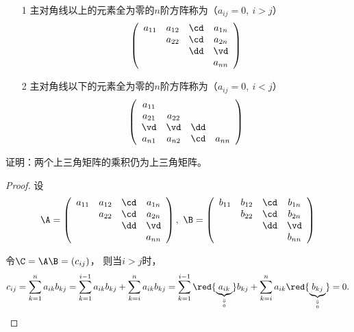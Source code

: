% 
\begin{dingyi}[三角矩阵]
  \begin{itemize}
  \item[1] 主对角线以上的元素全为零的$n$阶方阵称为（$a_{ij}=0, ~i>j$）
    $$
    \left(
      \begin{array}{cccc}
        a_{11} & a_{12} & \cd & a_{1n} \\
               & a_{22} & \cd & a_{2n} \\
               &       & \dd & \vd   \\
               &       &     & a_{nn}
      \end{array}
    \right)
    $$
  \item[2] 主对角线以下的元素全为零的$n$阶方阵称为（$a_{ij}=0, ~i<j$）
    $$
    \left(
      \begin{array}{cccc}
        a_{11} &       &     &       \\
        a_{21} & a_{22} &     &  \\
        \vd   & \vd   & \dd &    \\
        a_{n1} & a_{n2} & \cd & a_{nn}
      \end{array}
    \right)
    $$
  \end{itemize}
\end{dingyi}
\begin{li}
  证明：两个上三角矩阵的乘积仍为上三角矩阵。
\end{li}
\begin{proof}
  设
  $$
  \A = \left(
    \begin{array}{cccc}
      a_{11} & a_{12} & \cd & a_{1n} \\
             & a_{22} & \cd & a_{2n} \\
             &       & \dd & \vd   \\
             &       &     & a_{nn}
    \end{array}
  \right), ~     \B = \left(
    \begin{array}{cccc}
      b_{11} & b_{12} & \cd & b_{1n} \\
             & b_{22} & \cd & b_{2n} \\
             &       & \dd & \vd   \\
             &       &     & b_{nn}
    \end{array}
  \right)
  $$
  
  令$\C = \A\B = (c_{ij})$，
  则当$i>j$时，
  $$
  c_{ij} = \sum_{k=1}^n a_{ik}b_{kj}   
  = \sum_{k=1}^{i-1} a_{ik}b_{kj}  + \sum_{k=i}^n a_{ik}b_{kj}  
  = \sum_{k=1}^{i-1} \red{\underbrace{a_{ik}}_{\Downarrow\atop0}}b_{kj}  
  + \sum_{k=i}^n a_{ik}\red{\underbrace{b_{kj}}_{\Downarrow\atop0}}  = 0.
  $$
\end{proof}

